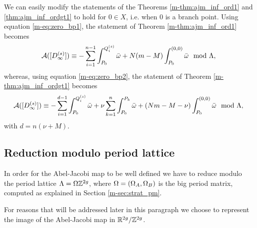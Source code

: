 \documentclass[main.tex]{subfiles}
\begin{document}
    \begin{rmk}\label{rmk:zero_bp}
     We can easily modify the statements of the Theorems \ref{m-thm:ajm_inf_ord1} and \ref{thm:ajm_inf_ordgt1} to hold for
     $0 \in X$, i.e. when $0$ is a branch point. 
     Using equation \eqref{m-eq:zero_bp1}, the statement of Theorem \ref{m-thm:ajm_inf_ord1} becomes
      \begin{equation*}
       \mathcal{A}( [D_{\infty}^{(s)}] ) \equiv -\sum_{i = 1}^{n-1} \int_{P_0}^{Q_i^{(s)}} \bar{\omega} + N(m-M) \int_{P_0}^{(0,0)} \bar{\omega} \mod \Lambda,
    \end{equation*}
    whereas, using equation \eqref{m-eq:zero_bp2}, the statement of Theorem \ref{m-thm:ajm_inf_ordgt1} becomes
      \begin{equation*}
       \mathcal{A}( [D_{\infty}^{(s)}] ) \equiv -\sum_{i = 1}^{d-1} \int_{P_0}^{Q_i^{(s)}} \bar{\omega} + \nu \sum_{k=1}^n
      \int_{P_0}^{P_k} \bar{\omega} + (Nm-M-\nu) \int_{P_0}^{(0,0)} \bar{\omega} \mod \Lambda,
    \end{equation*}
    with $d = n(\nu+M)$.
    \end{rmk}

  \subsection{Reduction modulo period lattice}\label{subsec:lat_red}

    In order for the Abel-Jacobi map to be well defined we have to reduce modulo the period lattice $\Lambda = 
  \Omega\mathbb{Z}^{2g}$, where $\Omega = (\Omega_A, \Omega_B)$ is the big period matrix, computed as explained in
  Section \ref{m-sec:strat_pm}.
   
   For reasons that will be addressed later in this paragraph
   we choose to
   represent the image of the Abel-Jacobi map in 
    $\mathbb{R}^{2g} / \mathbb{Z}^{2g}$.
    
\end{document}
